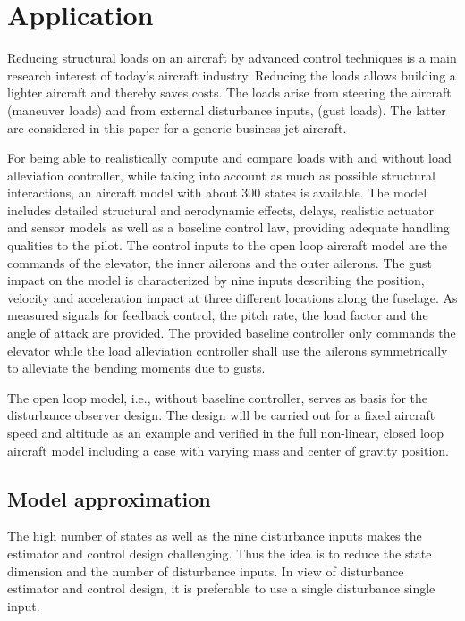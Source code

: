 \documentclass[graybox]{svmult}
\begin{document}
\section{Application}\label{sec:app}
Reducing structural loads on an aircraft by advanced control techniques is a main research interest of today's aircraft industry. Reducing the loads allows building a lighter aircraft and thereby  saves costs. The loads arise from steering the aircraft (maneuver loads) and from external disturbance inputs, (gust loads). The latter are considered in this paper for a generic business jet aircraft.

For being able to realistically compute and compare loads with  and without load alleviation controller, while taking into account as much as possible structural interactions, an aircraft model with about  300 states  is available. The model includes detailed structural and aerodynamic effects, delays, realistic actuator and sensor models as well as a baseline control law, providing adequate handling qualities to the pilot.
The control inputs to the open loop aircraft model are the  commands of the elevator, the inner ailerons and the outer ailerons. 
The gust impact on the model is characterized by  nine inputs describing the position, velocity and acceleration impact at three different locations along the fuselage.
As measured signals for feedback control, the pitch rate, the load factor  and the angle of attack are provided.
The provided baseline controller only commands the elevator while  the load alleviation controller shall use the ailerons symmetrically to alleviate the bending moments due to gusts.

The open loop model, i.e., without baseline controller, serves as basis for the disturbance observer design. The design will be carried out for a fixed aircraft speed and altitude as an example and verified in the full non-linear, closed loop aircraft model including a case with varying mass and center of gravity position.

\subsection{Model approximation}
The high number of states as well as the nine disturbance inputs makes the 
estimator and control design challenging. Thus the idea is to reduce the state dimension and the number  of disturbance inputs. In view of disturbance estimator and control design, it is preferable to use a single disturbance single input.
\end{document}
